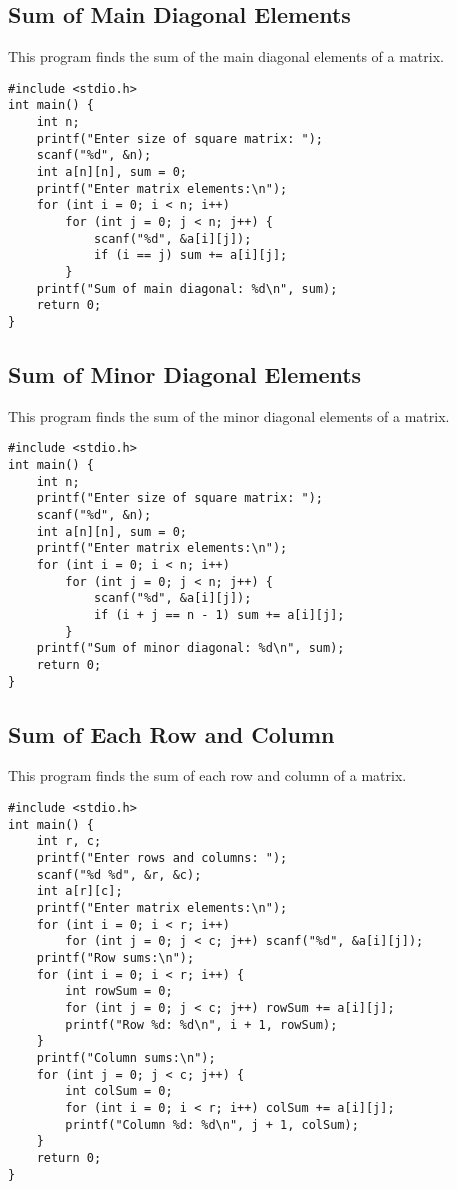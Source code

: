 \documentclass[a4paper,12pt]{article}
\begin{document}
\subsection{Sum of Main Diagonal Elements}
This program finds the sum of the main diagonal elements of a matrix.
\begin{lstlisting}[caption={Sum of Main Diagonal Elements}]
#include <stdio.h>
int main() {
    int n;
    printf("Enter size of square matrix: ");
    scanf("%d", &n);
    int a[n][n], sum = 0;
    printf("Enter matrix elements:\n");
    for (int i = 0; i < n; i++)
        for (int j = 0; j < n; j++) {
            scanf("%d", &a[i][j]);
            if (i == j) sum += a[i][j];
        }
    printf("Sum of main diagonal: %d\n", sum);
    return 0;
}
\end{lstlisting}
\clearpage

\subsection{Sum of Minor Diagonal Elements}
This program finds the sum of the minor diagonal elements of a matrix.
\begin{lstlisting}[caption={Sum of Minor Diagonal Elements}]
#include <stdio.h>
int main() {
    int n;
    printf("Enter size of square matrix: ");
    scanf("%d", &n);
    int a[n][n], sum = 0;
    printf("Enter matrix elements:\n");
    for (int i = 0; i < n; i++)
        for (int j = 0; j < n; j++) {
            scanf("%d", &a[i][j]);
            if (i + j == n - 1) sum += a[i][j];
        }
    printf("Sum of minor diagonal: %d\n", sum);
    return 0;
}
\end{lstlisting}
\clearpage

\subsection{Sum of Each Row and Column}
This program finds the sum of each row and column of a matrix.
\begin{lstlisting}[caption={Sum of Each Row and Column}]
#include <stdio.h>
int main() {
    int r, c;
    printf("Enter rows and columns: ");
    scanf("%d %d", &r, &c);
    int a[r][c];
    printf("Enter matrix elements:\n");
    for (int i = 0; i < r; i++)
        for (int j = 0; j < c; j++) scanf("%d", &a[i][j]);
    printf("Row sums:\n");
    for (int i = 0; i < r; i++) {
        int rowSum = 0;
        for (int j = 0; j < c; j++) rowSum += a[i][j];
        printf("Row %d: %d\n", i + 1, rowSum);
    }
    printf("Column sums:\n");
    for (int j = 0; j < c; j++) {
        int colSum = 0;
        for (int i = 0; i < r; i++) colSum += a[i][j];
        printf("Column %d: %d\n", j + 1, colSum);
    }
    return 0;
}
\end{lstlisting}
\clearpage
\end{document}
